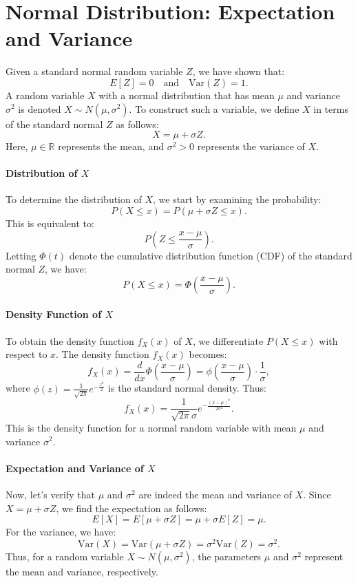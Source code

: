 \section{Normal Distribution: Expectation and Variance}
Given a standard normal random variable \( Z \), we have shown that:
\[
E[Z] = 0 \quad \text{and} \quad \text{Var}(Z) = 1.
\]
A random variable \( X \) with a normal distribution that has mean \( \mu \) and variance \( \sigma^2 \) is denoted \( X \sim N(\mu, \sigma^2) \). To construct such a variable, we define \( X \) in terms of the standard normal \( Z \) as follows:
\[
X = \mu + \sigma Z.
\]
Here, \( \mu \in \mathbb{R} \) represents the mean, and \( \sigma^2 > 0 \) represents the variance of \( X \).

\paragraph{Distribution of \( X \)}
To determine the distribution of \( X \), we start by examining the probability:
\[
P(X \leq x) = P(\mu + \sigma Z \leq x).
\]
This is equivalent to:
\[
P\left( Z \leq \frac{x - \mu}{\sigma} \right).
\]
Letting \( \Phi(t) \) denote the cumulative distribution function (CDF) of the standard normal \( Z \), we have:
\[
P(X \leq x) = \Phi\left( \frac{x - \mu}{\sigma} \right).
\]

\paragraph{Density Function of \( X \)}
To obtain the density function \( f_X(x) \) of \( X \), we differentiate \( P(X \leq x) \) with respect to \( x \). The density function \( f_X(x) \) becomes:
\[
f_X(x) = \frac{d}{dx} \Phi\left( \frac{x - \mu}{\sigma} \right) = \phi\left( \frac{x - \mu}{\sigma} \right) \cdot \frac{1}{\sigma},
\]
where \( \phi(z) = \frac{1}{\sqrt{2\pi}} e^{-\frac{z^2}{2}} \) is the standard normal density. Thus:
\[
f_X(x) = \frac{1}{\sqrt{2 \pi} \sigma} e^{-\frac{(x - \mu)^2}{2\sigma^2}}.
\]
This is the density function for a normal random variable with mean \( \mu \) and variance \( \sigma^2 \).

\paragraph{Expectation and Variance of \( X \)}
Now, let's verify that \( \mu \) and \( \sigma^2 \) are indeed the mean and variance of \( X \). Since \( X = \mu + \sigma Z \), we find the expectation as follows:
\[
E[X] = E[\mu + \sigma Z] = \mu + \sigma E[Z] = \mu.
\]
For the variance, we have:
\[
\text{Var}(X) = \text{Var}(\mu + \sigma Z) = \sigma^2 \text{Var}(Z) = \sigma^2.
\]
Thus, for a random variable \( X \sim N(\mu, \sigma^2) \), the parameters \( \mu \) and \( \sigma^2 \) represent the mean and variance, respectively.

